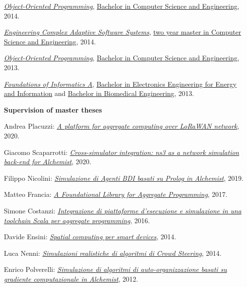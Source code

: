 \begin{outerlist}
\begin{innerlist}
      \item \href{http://archive.fo/8jzEp}{\textit{Object-Oriented Programming}}, \href{http://archive.fo/UM5wl}{Bachelor in Computer Science and Engineering}, 2014.
      \item \href{http://archive.fo/h8JCD}{\textit{Engineering Complex Adaptive Software Systems}}, \href{http://archive.fo/toz5c}{two year master in Computer Science and Engineering}, 2014.
      \item \href{http://archive.fo/0Gr16}{\textit{Object-Oriented Programming}}, \href{http://archive.fo/UM5wl}{Bachelor in Computer Science and Engineering}, 2013.
      \item \href{http://archive.fo/XZFR0}{\textit{Foundations of Informatics A}}, \href{http://archive.fo/30rN0}{Bachelor in Electronics Engineering for Energy and Information} and \href{http://archive.fo/jW52L}{Bachelor in Biomedical Engineering}, 2013.
    \end{innerlist}
\item[] \textbf{Supervision of master theses} %
    \begin{innerlist}
      \item Andrea Placuzzi: \href{http://amslaurea.unibo.it/20484/}{\textit{A platform for aggregate computing over LoRaWAN network}}, 2020.
      \item Giacomo Scaparrotti: \href{http://amslaurea.unibo.it/20440/}{\textit{Cross-simulator integration: ns3 as a network simulation back-end for Alchemist}}, 2020.
      \item Filippo Nicolini: \href{http://amslaurea.unibo.it/19521/}{\textit{Simulazione di Agenti BDI basati su Prolog in Alchemist}}, 2019.
      \item Matteo Francia: \href{http://amslaurea.unibo.it/13090/}{\textit{A Foundational Library for Aggregate Programming}}, 2017.
      \item Simone Costanzi: \href{http://amslaurea.unibo.it/10519/}{\textit{Integrazione di piattaforme d'esecuzione e simulazione in una toolchain Scala per aggregate programming}}, 2016.
      \item Davide Ensini: \href{http://amslaurea.unibo.it/7990/}{\textit{Spatial computing per smart devices}}, 2014.
      \item Luca Nenni: \href{http://amslaurea.unibo.it/6927/}{\textit{Simulazioni realistiche di algoritmi di Crowd Steering}}, 2014.
      \item Enrico Polverelli: \href{http://amslaurea.unibo.it/5293/}{\textit{Simulazione di algoritmi di auto-organizzazione basati su gradiente computazionale in Alchemist}}, 2012.

\end{innerlist}
\end{outerlist}
